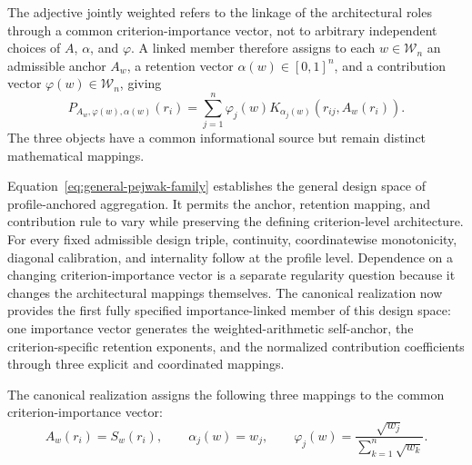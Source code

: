 \documentclass[reqno,11pt]{amsart}
\theoremstyle{definition}
\theoremstyle{plain}
\theoremstyle{remark}
\begin{document}
The adjective jointly weighted refers to the linkage of the architectural roles through a common criterion-importance vector, not to arbitrary independent choices of $A$, $\alpha$, and $\varphi$. A linked member therefore assigns to each $w\in\mathcal W_n$ an admissible anchor $A_w$, a retention vector $\alpha(w)\in[0,1]^n$, and a contribution vector $\varphi(w)\in\mathcal W_n$, giving
\begin{equation*}
P_{A_w,\varphi(w),\alpha(w)}(r_i)
=
\sum_{j=1}^{n}
\varphi_j(w)
K_{\alpha_j(w)}
\left(
r_{ij},A_w(r_i)
\right).
\end{equation*}
The three objects have a common informational source but remain distinct mathematical mappings.

Equation~\eqref{eq:general-pejwak-family} establishes the general design
space of profile-anchored aggregation. It permits the anchor, retention
mapping, and contribution rule to vary while preserving the defining
criterion-level architecture. For every fixed admissible design triple,
continuity, coordinatewise monotonicity, diagonal calibration, and
internality follow at the profile level. Dependence on a changing
criterion-importance vector is a separate regularity question because it
changes the architectural mappings themselves. The canonical
realization now provides the first fully specified importance-linked
member of this design space: one importance vector generates the
weighted-arithmetic self-anchor, the criterion-specific retention
exponents, and the normalized contribution coefficients through three
explicit and coordinated mappings.

The canonical realization assigns the following three mappings to the common criterion-importance vector:
\[
A_w(r_i)=S_w(r_i),
\qquad
\alpha_j(w)=w_j,
\qquad
\varphi_j(w)=
\frac{\sqrt{w_j}}{\sum_{k=1}^{n}\sqrt{w_k}}.
\]
\end{document}
